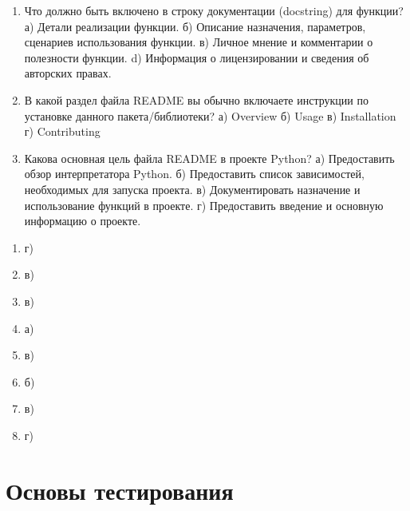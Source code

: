\documentclass[letterpaper,10pt,russian]{sphinxmanual}
\begin{document}
\begin{enumerate}
\item {} 
\sphinxAtStartPar
Что должно быть включено в строку документации (docstring) для функции?
а) Детали реализации функции.
б) Описание назначения, параметров, сценариев использования функции.
в) Личное мнение и комментарии о полезности функции.
d) Информация о лицензировании и сведения об авторских правах.

\item {} 
\sphinxAtStartPar
В какой раздел файла README вы обычно включаете инструкции по установке данного пакета/библиотеки?
а) Overview
б) Usage
в) Installation
г) Contributing

\item {} 
\sphinxAtStartPar
Какова основная цель файла README в проекте Python?
а) Предоставить обзор интерпретатора Python.
б) Предоставить список зависимостей, необходимых для запуска проекта.
в) Документировать назначение и использование функций в проекте.
г) Предоставить введение и основную информацию о проекте.

\end{enumerate}

\sphinxAtStartPar
{}
\begin{enumerate}
%
\item {} 
\sphinxAtStartPar
г)

\item {} 
\sphinxAtStartPar
в)

\item {} 
\sphinxAtStartPar
в)

\item {} 
\sphinxAtStartPar
а)

\item {} 
\sphinxAtStartPar
в)

\item {} 
\sphinxAtStartPar
б)

\item {} 
\sphinxAtStartPar
в)

\item {} 
\sphinxAtStartPar
г)

\end{enumerate}


\chapter{Основы тестирования}
\label{\detokenize{index:id13}}
\sphinxstepscope
\end{document}
